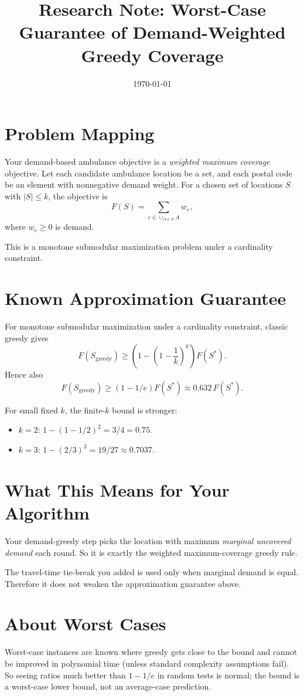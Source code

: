 \documentclass[11pt]{article}
\title{Research Note: Worst-Case Guarantee of Demand-Weighted Greedy Coverage}
\author{}
\date{\today}
\begin{document}
\maketitle

\section{Problem Mapping}
Your demand-based ambulance objective is a \emph{weighted maximum coverage} objective.
Let each candidate ambulance location be a set, and each postal code be an element with nonnegative demand weight.
For a chosen set of locations $S$ with $|S| \le k$, the objective is
\[
F(S) = \sum_{e \in \cup_{A \in S} A} w_e,
\]
where $w_e \ge 0$ is demand.

This is a monotone submodular maximization problem under a cardinality constraint.

\section{Known Approximation Guarantee}
For monotone submodular maximization under a cardinality constraint, classic greedy gives
\[
F(S_{\text{greedy}}) \ge \left(1 - \left(1 - \frac{1}{k}\right)^k\right) F(S^*).
\]
Hence also
\[
F(S_{\text{greedy}}) \ge (1 - 1/e) F(S^*) \approx 0.632\, F(S^*).
\]

For small fixed $k$, the finite-$k$ bound is stronger:
\begin{itemize}
\item $k=2$: $1-(1-1/2)^2 = 3/4 = 0.75$.
\item $k=3$: $1-(2/3)^3 = 19/27 \approx 0.7037$.
\end{itemize}

\section{What This Means for Your Algorithm}
Your demand-greedy step picks the location with maximum \emph{marginal uncovered demand} each round.
So it is exactly the weighted maximum-coverage greedy rule.

The travel-time tie-break you added is used only when marginal demand is equal.
Therefore it does not weaken the approximation guarantee above.

\section{About Worst Cases}
Worst-case instances are known where greedy gets close to the bound and cannot be improved in polynomial time (unless standard complexity assumptions fail).
So seeing ratios much better than $1-1/e$ in random tests is normal; the bound is a worst-case lower bound, not an average-case prediction.
\end{document}
